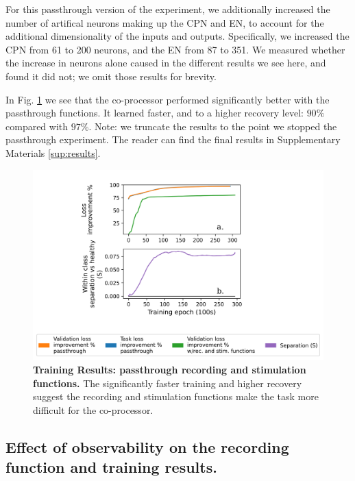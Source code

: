 \documentclass[12pt]{iopart}
\begin{document}
For this passthrough version of the experiment, we additionally increased the number of artifical neurons
making up the CPN and EN, to account for the additional dimensionality of the inputs and outputs. Specifically,
we increased the CPN from 61 to 200 neurons, and the EN from 87 to 351. We measured whether the increase in
neurons alone caused in the different results we see here, and found it did not; we omit those results for
brevity.

In Fig. \ref{fig:results_passthrough} we see that the co-processor performed significantly better with
the passthrough functions. It learned faster, and to a higher recovery level: $90\%$ compared with $97\%$.
Note: we truncate the results to the point we stopped the passthrough experiment. The reader can find the
final results in Supplementary Materials \ref{sup:results}.

\begin{figure}[h!]
\centering
\includegraphics[scale=0.7]{training_results_passthrough.png}
\caption{\textbf{Training Results: passthrough recording and stimulation functions.} The significantly faster
         training and higher recovery suggest the recording and stimulation functions make the task
         more difficult for the co-processor.}
\label{fig:results_passthrough}
\end{figure}

\subsection{Effect of observability on the recording function and training results.}
\label{sup:observability}
\end{document}

